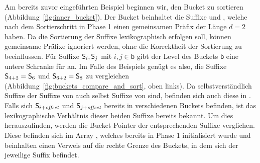 Am bereits zuvor eingeführten Beispiel beginnen wir, den Bucket  zu sortieren (Abbildung~\ref{fig:inner_bucket}). Der Bucket beinhaltet die Suffixe  und , welche nach dem Sortierschritt in Phase 1 einen gemeinsamen Präfix der Länge \(d = 2\) haben. Da die Sortierung der Suffixe lexikographisch erfolgen soll, können gemeinsame Präfixe ignoriert werden, ohne die Korrektheit der Sortierung zu beeinflussen. 
Für Suffixe \(\mathsf{S}_{i}, \mathsf{S}_{j}\) mit \(i, j \in \mathsf{b}\) gibt der Level des Buckets \(\mathsf{b}\) eine untere Schranke für \offset an. Im Falle des Beispiels genügt es also, die Suffixe \(\mathsf{S}_{4+2} = \mathsf{S}_{6}\) und \(\mathsf{S}_{6+2} = \mathsf{S}_{8}\) zu vergleichen (Abbildung~\ref{fig:buckets_compare_and_sort}, oben links). Da selbstverständlich Suffixe der Suffixe von  auch selbst Suffixe von  sind, befinden sich auch diese in \sa. Falls  sich \(\mathsf{S}_{i+\textit{offset}}\) und \(\mathsf{S}_{j+\textit{offset}}\) bereits in verschiedenen Buckets befinden, ist das lexikographische Verhältnis dieser beiden Suffixe bereits bekannt. Um dies herauszufinden, werden die Bucket Pointer der entsprechenden Suffixe verglichen. Diese befinden sich im Array \bptr, welches bereits in Phase 1 initialisiert wurde und beinhalten einen Verweis auf die rechte Grenze des Buckets, in dem sich der jeweilige Suffix befindet.\par

